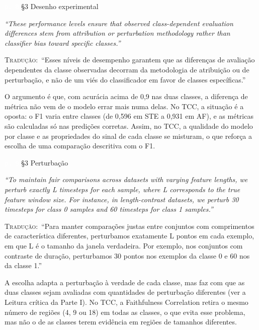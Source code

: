 \documentclass[11pt,a4paper]{article}
\newcommand{\pagechip}[1]{{\setlength{\fboxsep}{1.5pt}\colorbox{cAcc}{\textcolor{white}{\scriptsize\texttt{#1}}}}}
\newenvironment{origquote}{\par\itshape\small}{\par}
\newenvironment{tradquote}{\par\small\textsc{Tradução:}\ }{\par}
\newcommand{\explab}[1]{\par\smallskip{\small\color{cAcc}\textbf{\MakeUppercase{#1}}}\par}
\begin{document}
\begin{citacard}{\pagechip{p. 8} §3 Desenho experimental}
\begin{origquote}“These performance levels ensure that observed class-dependent evaluation differences stem from attribution or perturbation methodology rather than classifier bias toward specific classes.”\end{origquote}
\begin{tradquote}“Esses níveis de desempenho garantem que as diferenças de avaliação dependentes da classe observadas decorram da metodologia de atribuição ou de perturbação, e não de um viés do classificador em favor de classes específicas.”\end{tradquote}
\explab{Explicação}
O argumento é que, com acurácia acima de 0,9 nas duas classes, a diferença de métrica não vem de o modelo errar mais numa delas. No TCC, a situação é a oposta: o F1 varia entre classes (de 0,596 em STE a 0,931 em AF), e as métricas são calculadas só nas predições corretas. Assim, no TCC, a qualidade do modelo por classe e as propriedades do sinal de cada classe se misturam, o que reforça a escolha de uma comparação descritiva com o F1.
\end{citacard}

\begin{citacard}{\pagechip{p. 9} §3 Perturbação}
\begin{origquote}“To maintain fair comparisons across datasets with varying feature lengths, we perturb exactly L timesteps for each sample, where L corresponds to the true feature window size. For instance, in length-contrast datasets, we perturb 30 timesteps for class 0 samples and 60 timesteps for class 1 samples.”\end{origquote}
\begin{tradquote}“Para manter comparações justas entre conjuntos com comprimentos de característica diferentes, perturbamos exatamente L pontos em cada exemplo, em que L é o tamanho da janela verdadeira. Por exemplo, nos conjuntos com contraste de duração, perturbamos 30 pontos nos exemplos da classe 0 e 60 nos da classe 1.”\end{tradquote}
\explab{Explicação}
A escolha adapta a perturbação à verdade de cada classe, mas faz com que as duas classes sejam avaliadas com quantidades de perturbação diferentes (ver a Leitura crítica da Parte I). No TCC, a Faithfulness Correlation retira o mesmo número de regiões (4, 9 ou 18) em todas as classes, o que evita esse problema, mas não o de as classes terem evidência em regiões de tamanhos diferentes.
\end{citacard}
\end{document}

